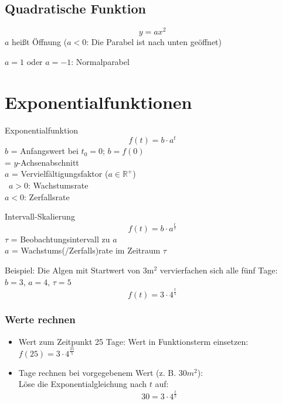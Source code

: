 \begin{multicols}{2}

\forceCB
\subsection*{Quadratische Funktion}
$$y=ax^2$$
$a$ heißt Öffnung ($a<0$: Die Parabel ist nach unten geöffnet)

$a=1$ oder $a=-1$: Normalparabel

\hrulefill
\section*{Exponentialfunktionen}
\begin{gesetz*}{Exponentialfunktion}{}
$$f(t) = b\cdot{}a^t$$
$b$ = Anfangswert bei $t_0=0$; $b=f(0)$\\
\phantom{$b$} = $y$-Achsenabschnitt\\
$a$ = Vervielfältigungsfaktor ($a\in\mathbb{R}^{+}$)\\\
$a>0$: Wachstumsrate\\
$a<0$: Zerfallsrate
\end{gesetz*}


\begin{rezept*}{Intervall-Skalierung}{}
$$f(t) = b\cdot{}a^{\frac{t}{\tau}}$$
$\tau$ = Beobachtungsintervall zu $a$\\
$a$ = Wachstums(/Zerfalls)rate im Zeitraum $\tau$
\end{rezept*}

Beispiel: Die Algen mit Startwert von $3\textrm{m}^2$ vervierfachen
sich alle fünf Tage:\\
$b=3$, $a=4$, $\tau=5$
$$f(t)= 3\cdot{}4^\frac{t}{5}$$

\subsubsection*{Werte rechnen}
\begin{itemize}
\item
Wert zum Zeitpunkt 25 Tage: Wert in Funktionsterm einsetzen:\\
$f(25) = 3\cdot{}4^\frac{25}{5}$

\item
Tage rechnen bei vorgegebenem Wert (z. B. $30m^2$):\\
Löse die Exponentialgleichung nach $t$ auf:\\
$$30 = 3\cdot{}4^{\frac{t}{5}}$$
\end{itemize}


\end{multicols}
